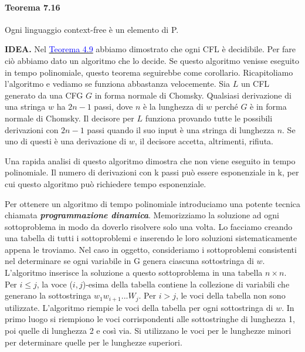 \documentclass{article}
\begin{document}
\paragraph{Teorema 7.16}
\label{teorema-7.16}
\text{}
\newline
Ogni linguaggio context-free è un elemento di P.

\text{}
\newline
\textbf{IDEA.}
Nel \hyperref[teorema-4.9]{\textcolor{blue}{Teorema 4.9}} abbiamo dimostrato che ogni CFL è decidibile.
Per fare ciò abbiamo dato un algoritmo che lo decide. 
Se questo algoritmo venisse eseguito in tempo polinomiale, questo teorema seguirebbe come corollario.
Ricapitoliamo l'algoritmo e vediamo se funziona abbastanza velocemente. 
Sia $L$ un CFL generato da una CFG $G$ in forma normale di Chomsky.
Qualsiasi derivazione di una stringa $w$ ha $2n - 1$ passi, dove $n$ è la lunghezza di $w$ perché $G$ è in forma normale di Chomsky.
Il decisore per $L$ funziona provando tutte le possibili derivazioni con $2n - 1$ passi quando il suo input è una stringa di lunghezza $n$. 
Se uno di questi è una derivazione di $w$, il decisore accetta, altrimenti, rifiuta.

Una rapida analisi di questo algoritmo dimostra che non viene eseguito in tempo polinomiale. 
Il numero di derivazioni con k passi può essere esponenziale in k, per cui questo algoritmo può richiedere tempo esponenziale.

Per ottenere un algoritmo di tempo polinomiale introduciamo una potente tecnica chiamata \textbf{\textit{programmazione dinamica}}.
Memorizziamo la soluzione ad ogni sottoproblema in modo da doverlo risolvere solo una volta. 
Lo facciamo creando una tabella di tutti i sottoproblemi e inserendo le loro soluzioni sistematicamente appena le troviamo.
Nel caso in oggetto, consideriamo i sottoproblemi consistenti nel determinare se ogni variabile in G genera ciascuna sottostringa di $w$.
L'algoritmo inserisce la soluzione a questo sottoproblema in una tabella $n \times n$.
Per $i \leq j$, la voce ($i, j$)-esima della tabella contiene la collezione di variabili che generano la sottostringa $w_1w_{i+1}...W_{j}$.
Per $i > j$, le voci della tabella non sono utilizzate. 
L'algoritmo riempie le voci della tabella per ogni sottostringa di $w$. 
In primo luogo si riempiono le voci corrispondenti alle sottostringhe di lunghezza 1, poi quelle di lunghezza 2 e così via.
Si utilizzano le voci per le lunghezze minori per determinare quelle per le lunghezze superiori.
\end{document}
